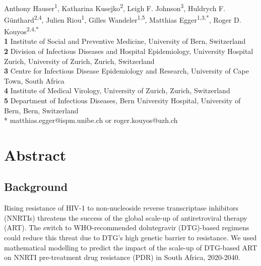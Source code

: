 \documentclass[10pt,letterpaper]{article}
\begin{document}
\vspace*{0.2in}

\begin{flushleft}
{\Large
\textbf{} 
}
\newline
\\
Anthony Hauser\textsuperscript{1},
Katharina Kusejko\textsuperscript{2},
Leigh F. Johnson\textsuperscript{3},
Huldrych F. Günthard\textsuperscript{2,4},
Julien Riou\textsuperscript{1},
Gilles Wandeler\textsuperscript{1,5},
Matthias Egger\textsuperscript{1,3,*},
Roger D. Kouyos\textsuperscript{2,4,*}
\\
\bigskip
\textbf{1} Institute of Social and Preventive Medicine, University of Bern, Switzerland
\\
\textbf{2} Division of Infectious Diseases and Hospital Epidemiology, University Hospital Zurich, University of Zurich, Zurich, Switzerland
\\
\textbf{3} Centre for Infectious Disease Epidemiology and Research, University of Cape Town, South Africa
\\
\textbf{4} Institute of Medical Virology, University of Zurich, Zurich, Switzerland
\\
\textbf{5} Department of Infectious Diseases, Bern University Hospital, University of Bern, Bern, Switzerland
\\
\bigskip
* matthias.egger@ispm.unibe.ch or roger.kouyos@uzh.ch

\end{flushleft}


\section*{Abstract}
\subsection*{Background} Rising resistance of HIV-1 to non-nucleoside reverse transcriptase inhibitors (NNRTIs) threatens the success of the global scale-up of antiretroviral therapy (ART). The switch to WHO-recommended dolutegravir (DTG)-based regimens could reduce this threat due to DTG’s high genetic barrier to resistance. We used mathematical modelling to predict the impact of the scale-up of DTG-based ART on NNRTI pre-treatment drug resistance (PDR) in South Africa, 2020-2040.
\end{document}
